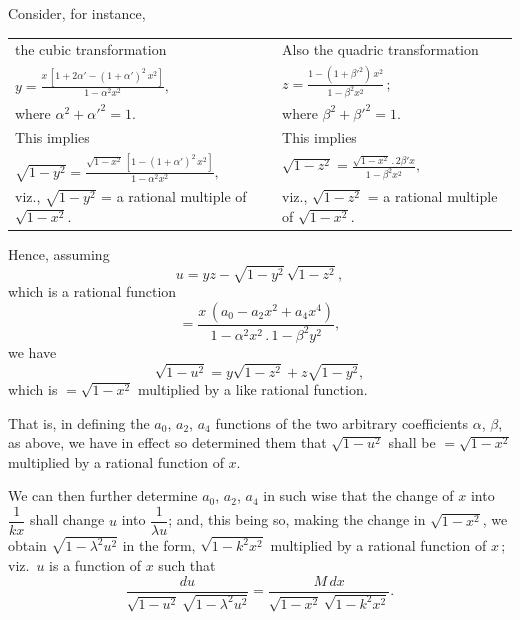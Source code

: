 \documentclass[11pt,a4paper]{article}
\providecommand{\textsc}[1]{{\scshape #1}}
\begin{document}
\medskip
\noindent Consider, for instance,
\begin{center}
\begin{tabular}{p{}p{}}
the cubic transformation & Also the quadric transformation \\[4pt]
$\displaystyle y = \frac{x\,[1 + 2\alpha' - (1 + \alpha')^{2}\,x^{2}]}{1 - \alpha^{2}x^{2}},$
& $\displaystyle z = \frac{1 - (1 + \beta'^{2})\,x^{2}}{1 - \beta^{2}x^{2}}\,;$ \\[14pt]
where $\alpha^{2} + \alpha'^{2} = 1$. & where $\beta^{2} + \beta'^{2} = 1$. \\[6pt]
This implies & This implies \\[4pt]
$\displaystyle \sqrt{1 - y^{2}} = \frac{\sqrt{1 - x^{2}}\,[1 - (1 + \alpha')^{2}\,x^{2}]}{1 - \alpha^{2}x^{2}},$
& $\displaystyle \sqrt{1 - z^{2}} = \frac{\sqrt{1 - x^{2}}\,.\,2\beta'x}{1 - \beta^{2}x^{2}},$ \\[14pt]
viz., $\sqrt{1 - y^{2}}$ = a rational multiple of $\sqrt{1 - x^{2}}$.
& viz., $\sqrt{1 - z^{2}}$ = a rational multiple of $\sqrt{1 - x^{2}}$.
\end{tabular}
\end{center}

\medskip
Hence, assuming
\[
u = yz - \sqrt{1 - y^{2}}\,\sqrt{1 - z^{2}},
\]
which is a rational function
\[
= \frac{x\,(a_{0} - a_{2}x^{2} + a_{4}x^{4})}{1 - \alpha^{2}x^{2}\,.\,1 - \beta^{2}y^{2}},
\]
we have
\[
\sqrt{1 - u^{2}} = y\sqrt{1 - z^{2}} + z\sqrt{1 - y^{2}},
\]
which is $= \sqrt{1 - x^{2}}$ multiplied by a like rational function.
\clearpage

\fancyhead[L]{\small 813]}
\fancyhead[C]{\small\textsc{note on mr griffiths' paper.}}

\thispagestyle{plain}
\noindent That is, in defining the $a_{0}$, $a_{2}$, $a_{4}$ functions of the two arbitrary coefficients $\alpha$, $\beta$, as above, we have in effect so determined them that $\sqrt{1 - u^{2}}$ shall be $= \sqrt{1 - x^{2}}$ multiplied by a rational function of $x$.

\medskip
We can then further determine $a_{0}$, $a_{2}$, $a_{4}$ in such wise that the change of $x$ into $\dfrac{1}{kx}$ shall change $u$ into $\dfrac{1}{\lambda u}$; and, this being so, making the change in $\sqrt{1 - x^{2}}$, we obtain $\sqrt{1 - \lambda^{2}u^{2}}$ in the form, $\sqrt{1 - k^{2}x^{2}}$ multiplied by a rational function of $x$\,; viz.\ $u$ is a function of $x$ such that
\[
\frac{du}{\sqrt{1 - u^{2}}\,\sqrt{1 - \lambda^{2}u^{2}}} = \frac{M\,dx}{\sqrt{1 - x^{2}}\,\sqrt{1 - k^{2}x^{2}}}.
\]
\end{document}
